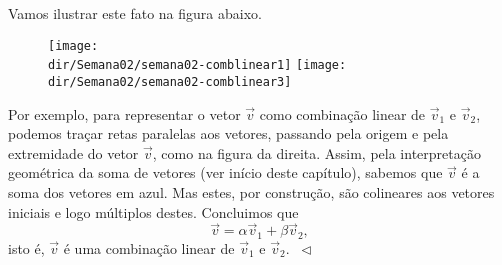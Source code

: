 \documentclass[../livro.tex]{subfiles}  %
\providecommand{\dir}{..}
\begin{document}
\begin{example}
Vamos ilustrar este fato na figura abaixo.
\begin{figure}[h!]
\begin{center}
\texttt{[image: \\dir/Semana02/semana02-comblinear1]}
\texttt{[image: \\dir/Semana02/semana02-comblinear3]}
\end{center}
\end{figure}
Por exemplo, para representar o vetor $\vec{v}$ como combinação linear de $\vec{v}_1$ e $\vec{v}_2$, podemos traçar retas paralelas aos vetores, passando pela origem e pela extremidade do vetor $\vec{v}$, como na figura da direita. Assim, pela interpretação geométrica da soma de vetores (ver início deste capítulo), sabemos que $\vec{v}$ é a soma dos vetores em azul. Mas estes, por construção, são colineares aos vetores iniciais e logo múltiplos destes. Concluimos que
\begin{equation}
\vec{v} = \alpha \vec{v}_1 + \beta \vec{v}_2,
\end{equation} isto é, $\vec{v}$ é uma combinação linear de $\vec{v}_1$ e $\vec{v}_2$. $\ \lhd$
\end{example}
\end{document}
